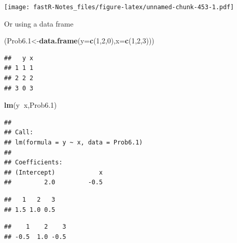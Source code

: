 \documentclass[]{book}
\newenvironment{Shaded}{\begin{snugshade}}{\end{snugshade}}
\newcommand{\KeywordTok}[1]{\textcolor[rgb]{0.13,0.29,0.53}{\textbf{#1}}}
\newcommand{\DataTypeTok}[1]{\textcolor[rgb]{0.13,0.29,0.53}{#1}}
\newcommand{\DecValTok}[1]{\textcolor[rgb]{0.00,0.00,0.81}{#1}}
\newcommand{\OperatorTok}[1]{\textcolor[rgb]{0.81,0.36,0.00}{\textbf{#1}}}
\newcommand{\NormalTok}[1]{#1}
\theoremstyle{definition}
\theoremstyle{definition}
\theoremstyle{definition}
\theoremstyle{remark}
\begin{document}
\texttt{[image: fastR-Notes\_files/figure-latex/unnamed-chunk-453-1.pdf]}

Or using a data frame

\begin{Shaded}
\begin{Highlighting}[]
\NormalTok{(Prob6.}\DecValTok{1}\NormalTok{<-}\KeywordTok{data.frame}\NormalTok{(}\DataTypeTok{y=}\KeywordTok{c}\NormalTok{(}\DecValTok{1}\NormalTok{,}\DecValTok{2}\NormalTok{,}\DecValTok{0}\NormalTok{),}\DataTypeTok{x=}\KeywordTok{c}\NormalTok{(}\DecValTok{1}\NormalTok{,}\DecValTok{2}\NormalTok{,}\DecValTok{3}\NormalTok{)))}
\end{Highlighting}
\end{Shaded}

\begin{verbatim}
##   y x
## 1 1 1
## 2 2 2
## 3 0 3
\end{verbatim}

\begin{Shaded}
\begin{Highlighting}[]
\KeywordTok{lm}\NormalTok{(y}\OperatorTok{~}\NormalTok{x,Prob6.}\DecValTok{1}\NormalTok{)}
\end{Highlighting}
\end{Shaded}

\begin{verbatim}
## 
## Call:
## lm(formula = y ~ x, data = Prob6.1)
## 
## Coefficients:
## (Intercept)            x  
##         2.0         -0.5
\end{verbatim}

\begin{Shaded}
\end{Shaded}

\begin{verbatim}
##   1   2   3 
## 1.5 1.0 0.5
\end{verbatim}

\begin{Shaded}
\end{Shaded}

\begin{verbatim}
##    1    2    3 
## -0.5  1.0 -0.5
\end{verbatim}
\end{document}
